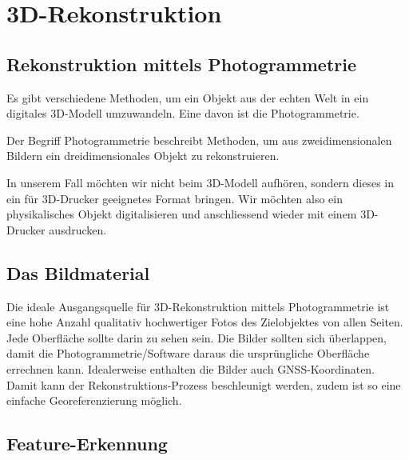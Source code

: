 \chapter{3D-Rekonstruktion}

\section{Rekonstruktion mittels Photogrammetrie}

Es gibt verschiedene Methoden, um ein Objekt aus der echten Welt in ein
digitales 3D-Modell umzuwandeln. Eine davon ist die Photogrammetrie.

Der Begriff Photogrammetrie beschreibt Methoden, um aus zweidimensionalen
Bildern ein dreidimensionales Objekt zu rekonstruieren.

In unserem Fall möchten wir nicht beim 3D-Modell aufhören, sondern dieses in
ein für 3D-Drucker geeignetes Format bringen. Wir möchten also ein
physikalisches Objekt digitalisieren und anschliessend wieder mit einem
3D-Drucker ausdrucken.


\section{Das Bildmaterial}

Die ideale Ausgangsquelle für 3D-Rekonstruktion mittels Photogrammetrie ist
eine hohe Anzahl qualitativ hochwertiger Fotos des Zielobjektes von allen
Seiten. Jede Oberfläche sollte darin zu sehen sein. Die Bilder sollten sich
überlappen, damit die Photogrammetrie\-/Software daraus die ursprüngliche
Oberfläche errechnen kann. Idealerweise enthalten die Bilder auch
GNSS-Koordinaten.
%
%
Damit kann der Rekonstruktions-Prozess beschleunigt werden, zudem ist so eine
einfache Georeferenzierung möglich.


\section{Feature-Erkennung} \label{photogrammetry:features}


